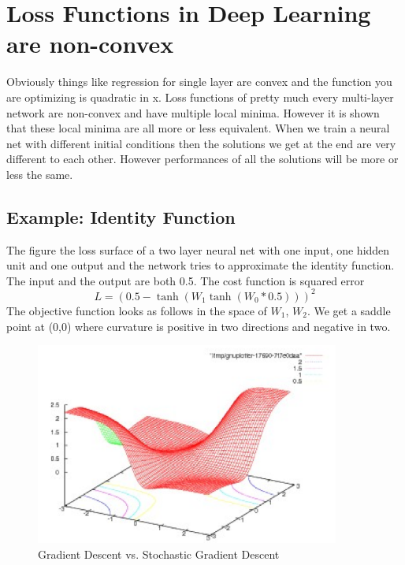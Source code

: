 \chapter{Loss Functions in Deep Learning are non-convex}\label{chp:Loss Functions in Deep Learning are non-convex}

Obviously things like regression for single layer are convex and the function you are optimizing is quadratic in x. 
Loss functions of pretty much every multi-layer network are non-convex and have multiple local minima.
However it is shown that these local minima are all more or less equivalent. 
When we train a neural net with different initial conditions then the solutions we get at the end are very different to each other. 
However performances of all the solutions will be more or less the same. 

\section{Example: Identity Function}
The figure the loss surface of a two layer neural net with one input, one hidden unit and one output and the network tries to approximate the identity function. 
The input and the output are both 0.5. The cost function is squared error 
\begin{equation}
    L = (0.5 - \tanh (W_1 \tanh (W_0 * 0.5)))^2
\end{equation}
The objective function looks as follows in the space of $W_1$, $W_2$. 
We get a saddle point at (0,0) where curvature is positive in two directions and negative in two.\\

\begin{figure}[ht]
\centering
\includegraphics[width=100mm]{lectures/02-b/Identity.PNG}
\caption{Gradient Descent vs. Stochastic Gradient Descent}
\label{fig:sgd}
\end{figure}

